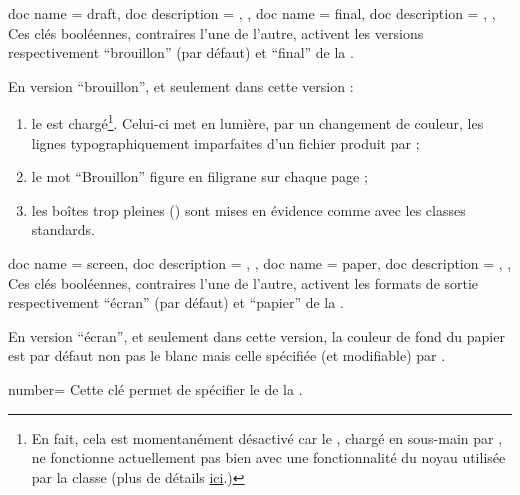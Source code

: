 \documentclass{letgut}
\begin{document}
\begin{docKeys}
  {
    {
      doc name = draft,
      doc description = {},
    },
    {
      doc name = final,
      doc description = {},
    },
  }%
  Ces clés booléennes, contraires l'une de l'autre, activent les versions
  respectivement \enquote{brouillon} (par défaut) et \enquote{final} de la
  .

  En version \enquote{brouillon}, et seulement dans cette version%
  :
  \begin{enumerate}
  \item le  est chargé\footnote{En fait, cela est
      momentanément désactivé car le , chargé en sous-main
      par , ne fonctionne actuellement pas bien avec une
      fonctionnalité du noyau  utilisée par la classe (plus de
      détails
      \href{https://github.com/ho-tex/luacolor/issues/4}{ici}.)}. Celui-ci met
    en lumière, par un changement de couleur, les lignes typographiquement
    imparfaites d’un fichier \pdf*{} produit par  ;
  \item le mot \enquote{Brouillon} figure en filigrane sur chaque page ;
  \item les boîtes trop pleines ()
    sont mises en évidence comme avec les classes standards.
  \end{enumerate}
\end{docKeys}

\begin{docKeys}
  {
    {
      doc name = screen,
      doc description = {},
    },
    {
      doc name = paper,
      doc description = {},
    },
  }%
  Ces clés booléennes, contraires l'une de l'autre, activent les formats de
  sortie respectivement \enquote{écran} (par défaut) et \enquote{papier} de la
  .

  En version \enquote{écran}, et seulement dans cette version, la couleur de
  fond du papier est par défaut non pas le blanc mais celle spécifiée (et
  modifiable) par .
\end{docKeys}

\begin{docKey}{number}{=}{\valinitdef}
  Cette clé permet de spécifier le  de la .
\end{docKey}
\end{document}
